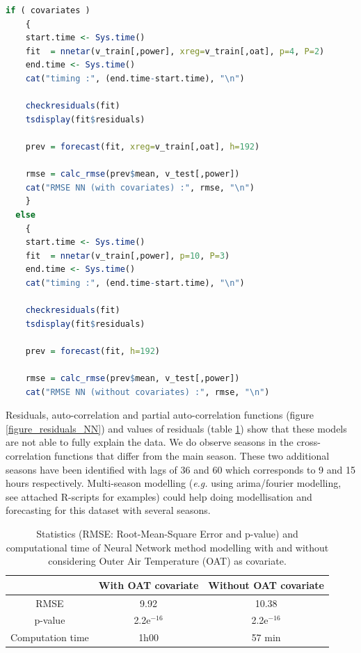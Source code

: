 \begin{lstlisting}[language=R, caption={R code for Neural Network method modelling and forecasting}, captionpos=b, label={lst_NN}]
  if ( covariates )
    {
    start.time <- Sys.time()
    fit  = nnetar(v_train[,power], xreg=v_train[,oat], p=4, P=2)
    end.time <- Sys.time()
    cat("timing :", (end.time-start.time), "\n")

    checkresiduals(fit)
    tsdisplay(fit$residuals)

    prev = forecast(fit, xreg=v_train[,oat], h=192)

    rmse = calc_rmse(prev$mean, v_test[,power])
    cat("RMSE NN (with covariates) :", rmse, "\n")
    }
  else
    {
    start.time <- Sys.time()
    fit  = nnetar(v_train[,power], p=10, P=3)
    end.time <- Sys.time()
    cat("timing :", (end.time-start.time), "\n")

    checkresiduals(fit)
    tsdisplay(fit$residuals)

    prev = forecast(fit, h=192)

    rmse = calc_rmse(prev$mean, v_test[,power])
    cat("RMSE NN (without covariates) :", rmse, "\n")
\end{lstlisting}

Residuals, auto-correlation and partial auto-correlation functions (figure 
\ref{figure_residuals_NN}) and values of residuals (table \ref{table_NN}) show that these models are 
not able to fully explain the data. We do observe seasons in the cross-correlation functions 
that differ from the main season. These two additional seasons have been identified with lags of 36 
and 60 which corresponds to 9 and 15 hours respectively. Multi-season modelling (\textit{e.g.} 
using arima/fourier modelling, see attached R-scripts for examples) could help doing modellisation 
and forecasting for this dataset with several seasons. 

\begin{table}[H]
\centering \begin{tabular}{c|cc}
                 & With OAT covariate & Without OAT covariate\\\hline\hline
RMSE             &   9.92    & 10.38 \\
p-value          & 2.2e$^{-16}$ &  2.2e$^{-16}$ \\
Computation time &  1h00     &  57 min \\
\end{tabular}
\caption{Statistics (RMSE: Root-Mean-Square Error and p-value) and computational time of Neural Network method modelling with and without considering Outer Air Temperature (OAT) as covariate.}
\label{table_NN}
\end{table}



